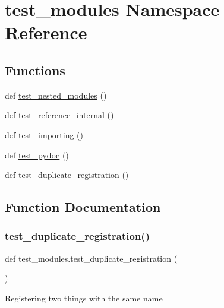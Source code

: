 \hypertarget{namespacetest__modules}{}\section{test\+\_\+modules Namespace Reference}
\label{namespacetest__modules}
\subsection*{Functions}
\begin{DoxyCompactItemize}
\item 
def \mbox{\hyperlink{namespacetest__modules_a383eb9773420deaa16f493858105f8de}{test\+\_\+nested\+\_\+modules}} ()
\item 
def \mbox{\hyperlink{namespacetest__modules_a901176e249357eafa5279edba5be65bf}{test\+\_\+reference\+\_\+internal}} ()
\item 
def \mbox{\hyperlink{namespacetest__modules_ad0967431a62f7804efd92190fd9e418a}{test\+\_\+importing}} ()
\item 
def \mbox{\hyperlink{namespacetest__modules_aa41222c837d6acd905da2cff357ed0b9}{test\+\_\+pydoc}} ()
\item 
def \mbox{\hyperlink{namespacetest__modules_ab7095021bf42bba1b6c835e02a2033a0}{test\+\_\+duplicate\+\_\+registration}} ()
\end{DoxyCompactItemize}


\subsection{Function Documentation}
\mbox{\label{namespacetest__modules_ab7095021bf42bba1b6c835e02a2033a0}} 
\subsubsection{\texorpdfstring{test\_duplicate\_registration()}{test\_duplicate\_registration()}}
{\footnotesize\ttfamily def test\+\_\+modules.\+test\+\_\+duplicate\+\_\+registration (\begin{DoxyParamCaption}{ }\end{DoxyParamCaption})}

\begin{DoxyVerb}Registering two things with the same name\end{DoxyVerb}
 \mbox{\label{namespacetest__modules_ad0967431a62f7804efd92190fd9e418a}} 
